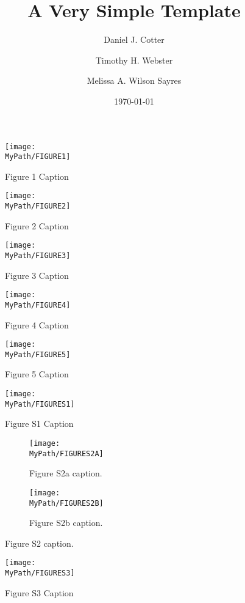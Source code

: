 \documentclass[12pt]{article}
\title{A Very Simple \LaTeXe{} Template}
\author[1,2]{Daniel J. Cotter}
\author[1]{Timothy H. Webster}
\author[1]{Melissa A. Wilson Sayres}
\affil[1]{Arizona State University}
\affil[2]{Stanford University}
\date{\today}
\newcommand*{\MyPath}{..}
\newcommand{\beginsupplement}{%
        \setcounter{table}{0}
        \renewcommand{\thetable}{S\arabic{table}}%
        \setcounter{figure}{0}
        \renewcommand{\thefigure}{S\arabic{figure}}%
     }
\begin{document}
\maketitle

\begin{abstract}

\end{abstract}

\begin{figure}
  \texttt{[image: \\MyPath/FIGURE1]}
  \caption{Figure 1 Caption}
  \label{fig:fig1}
\end{figure}

\begin{figure}
  \texttt{[image: \\MyPath/FIGURE2]}
  \caption{Figure 2 Caption}
  \label{fig:fig2}
\end{figure}

\begin{figure}
  \texttt{[image: \\MyPath/FIGURE3]}
  \caption{Figure 3 Caption}
  \label{fig:fig3}
\end{figure}

\begin{figure}
  \texttt{[image: \\MyPath/FIGURE4]}
  \caption{Figure 4 Caption}
  \label{fig:fig4}
\end{figure}

\begin{figure}
  \texttt{[image: \\MyPath/FIGURE5]}
  \caption{Figure 5 Caption}
  \label{fig:fig5}
\end{figure}

\beginsupplement

\begin{figure}
  \texttt{[image: \\MyPath/FIGURES1]}
  \caption{Figure S1 Caption}
  \label{fig:figS1}
\end{figure}

\begin{figure}[h!]
  \centering
  \begin{subfigure}[b]{0.4\linewidth}
    \texttt{[image: \\MyPath/FIGURES2A]}
    \caption{Figure S2a caption.}
  \end{subfigure}
  \begin{subfigure}[b]{0.4\linewidth}
    \texttt{[image: \\MyPath/FIGURES2B]}
    \caption{Figure S2b caption.}
  \end{subfigure}
  \caption{Figure S2 caption.}
  \label{fig:figS2}
\end{figure}

\begin{figure}
  \texttt{[image: \\MyPath/FIGURES3]}
  \caption{Figure S3 Caption}
  \label{fig:figS3}
\end{figure}
\end{document}
